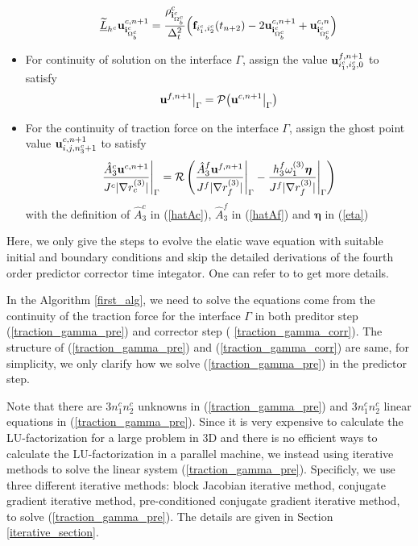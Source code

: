 \begin{breakablealgorithm}
\begin{itemize}
{			\begin{equation*}
			\uline{\wt{L}}_{h^c}{\bf u}_{{\bf i}^c_{\Omega^c_b}}^{c,n+1} = \frac{\rho^c_{{\bf i}^c_{\Omega^c_b}}}{\Delta_t^2}\Big({\bf f} _{i^c_1,i^c_2}(t_{n+2})-2{\bf u}_{{\bf i}^c_{\Omega^c_b}}^{c,n+1}+{\bf u}_{{\bf i}^c_{\Omega^c_b}}^{c,n}\Big)
			\end{equation*}
		}
		\item{For continuity of solution on the interface $\Gamma$, assign the value ${\bf u}^{f,n+1}_{i^c_1,i^c_2,0}$ to satisfy
			\begin{equation*}
			{\bf u}^{f,n+1}\big|_{\Gamma} = \mathcal{P}\big({\bf u}^{c,n+1}\big|_{\Gamma}\big)
			\end{equation*}
		}
		\item{For the continuity of traction force on the interface $\Gamma$, assign the ghost point value ${\bf u}^{c,n+1}_{i,j,n_3^c+1}$ to satisfy
			\begin{equation}\label{traction_gamma_corr}
			\frac{\hat{A}_3^c{\bf u}^{c,n+1}}{J^c|\nabla r_c^{(3)}|}\Bigg|_{\Gamma} = \mathcal{R}\left(\frac{\hat{A}_3^f{\bf u}^{f,n+1}}{J^f|\nabla r_f^{(3)}|}\Bigg|_{\Gamma} - \frac{h_3^f\omega_1^{(3)}{\bm \eta}}{J^f|\nabla r_f^{(3)}|}\Bigg|_{\Gamma}\right)
			\end{equation}
			with the definition of $\hat{A}^c_3$ in (\ref{hatAc}), $\hat{A}^f_3$ in (\ref{hatAf}) and ${\bm \eta}$ in (\ref{eta})
		}
	\end{itemize}
\end{breakablealgorithm}
Here, we only give the steps to evolve the elatic wave equation with suitable initial and boundary conditions and skip the detailed derivations of the fourth order predictor corrector time integator. One can refer to \cite{wang2018fourth} to get more details.

In the Algorithm \ref{first_alg}, we need to solve the equations come from the continuity of the traction force for the interface $\Gamma$ in both preditor step (\ref{traction_gamma_pre}) and corrector step (
\ref{traction_gamma_corr}). The structure of (\ref{traction_gamma_pre}) and (\ref{traction_gamma_corr}) are same, for simplicity, we only clarify how we solve (\ref{traction_gamma_pre}) in the predictor step.

Note that there are $3n_1^cn_2^c$ unknowns in (\ref{traction_gamma_pre}) and $3n_1^cn_2^c$ linear equations in (\ref{traction_gamma_pre}). Since it is very expensive to calculate the LU-factorization for a large problem in $3$D and there is no efficient ways to calculate the LU-factorization in a parallel machine, we instead using iterative methods to solve the linear system (\ref{traction_gamma_pre}). Specificly, we use three different iterative methods: block Jacobian iterative method, conjugate gradient iterative method, pre-conditioned conjugate gradient iterative method, to solve (\ref{traction_gamma_pre}). The details are given in Section \ref{iterative_section}.
